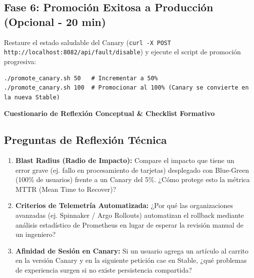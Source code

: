 \documentclass[10pt,letterpaper]{article}
\newcommand{\sectionBadge}[1]{%
  \refstepcounter{section}%
  \vspace{0.16cm}%
  \noindent%
  \colorbox{icesiBlue}{\color{white}\rule[-0.08cm]{0pt}{0.42cm}\hspace{0.16cm}\textbf{\normalsize \thesection}\hspace{0.16cm}}%
  \hspace{0.18cm}%
  {\fontsize{9.5}{12}\selectfont\textbf{\color{icesiDark}#1}}\\[-0.10cm]%
  \noindent{\color{icesiDark}\rule{\textwidth}{0.8pt}}\vspace{0.06cm}%
}
\begin{document}
\subsection{Fase 6: Promoción Exitosa a Producción (Opcional - 20 min)}
Restaure el estado saludable del Canary (\texttt{curl -X POST http://localhost:8082/api/fault/disable}) y ejecute el script de promoción progresiva:
\begin{lstlisting}[style=bashstyle]
./promote_canary.sh 50   # Incrementar a 50%
./promote_canary.sh 100  # Promocionar al 100% (Canary se convierte en la nueva Stable)
\end{lstlisting}

\sectionBadge{Cuestionario de Reflexión Conceptual \& Checklist Formativo}

\subsection{Preguntas de Reflexión Técnica}
\begin{enumerate}[leftmargin=*,itemsep=3pt]
  \item \textbf{Blast Radius (Radio de Impacto):} Compare el impacto que tiene un error grave (ej. fallo en procesamiento de tarjetas) desplegado con Blue-Green (100\% de usuarios) frente a un Canary del 5\%. ¿Cómo protege esto la métrica MTTR (Mean Time to Recover)?
  \item \textbf{Criterios de Telemetría Automatizada:} ¿Por qué las organizaciones avanzadas (ej. Spinnaker / Argo Rollouts) automatizan el rollback mediante análisis estadístico de Prometheus en lugar de esperar la revisión manual de un ingeniero?
  \item \textbf{Afinidad de Sesión en Canary:} Si un usuario agrega un artículo al carrito en la versión Canary y en la siguiente petición cae en Stable, ¿qué problemas de experiencia surgen si no existe persistencia compartida?
\end{enumerate}
\end{document}

